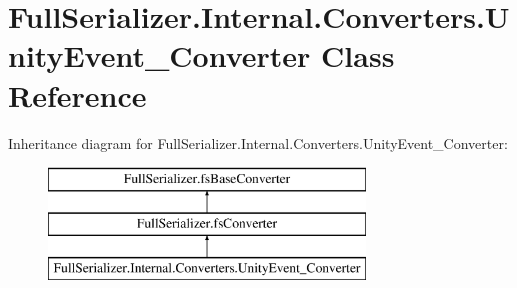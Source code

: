 \hypertarget{class_full_serializer_1_1_internal_1_1_converters_1_1_unity_event___converter}{}\section{Full\+Serializer.\+Internal.\+Converters.\+Unity\+Event\+\_\+\+Converter Class Reference}
\label{class_full_serializer_1_1_internal_1_1_converters_1_1_unity_event___converter}
Inheritance diagram for Full\+Serializer.\+Internal.\+Converters.\+Unity\+Event\+\_\+\+Converter\+:\begin{figure}[H]
\begin{center}
\leavevmode
\includegraphics[height=3.000000cm]{class_full_serializer_1_1_internal_1_1_converters_1_1_unity_event___converter}
\end{center}
\end{figure}
